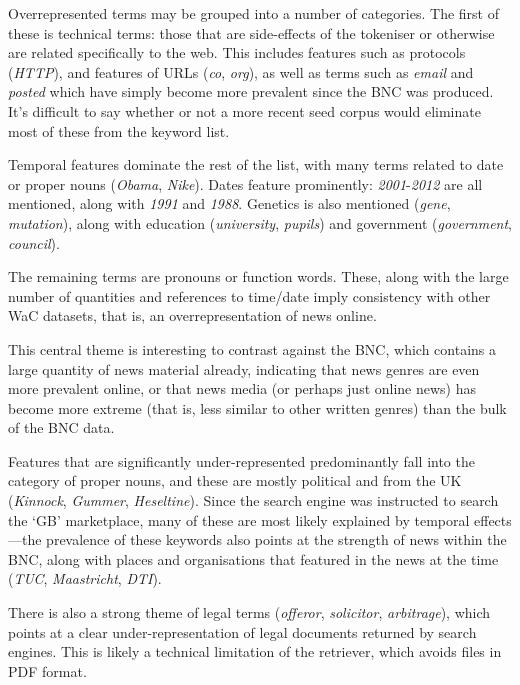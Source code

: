 Overrepresented terms may be grouped into a number of categories.  The first of these is technical terms: those that are side-effects of the tokeniser or otherwise are related specifically to the web.  This includes features such as protocols (\textsl{HTTP}), and features of URLs (\textsl{co}, \textsl{org}), as well as terms such as \textsl{email} and \textsl{posted} which have simply become more prevalent since the BNC was produced.  It's difficult to say whether or not a more recent seed corpus would eliminate most of these from the keyword list.



Temporal features dominate the rest of the list, with many terms related to date or proper nouns (\textsl{Obama}, \textsl{Nike}).  Dates feature prominently: \textsl{2001}-\textsl{2012} are all mentioned, along with \textsl{1991} and \textsl{1988}.  Genetics is also mentioned (\textsl{gene}, \textsl{mutation}), along with education (\textsl{university}, \textsl{pupils}) and government (\textsl{government}, \textsl{council}).

The remaining terms are pronouns or function words.  These, along with the large number of quantities and references to time/date imply consistency with other WaC datasets, that is, an overrepresentation of news online\cite{sridharan2012modeling}.

This central theme is interesting to contrast against the BNC, which contains a large quantity of news material already, indicating that news genres are even more prevalent online, or that news media (or perhaps just online news) has become more extreme (that is, less similar to other written genres) than the bulk of the BNC data.

Features that are significantly under-represented predominantly fall into the category of proper nouns, and these are mostly political and from the UK (\textsl{Kinnock}, \textsl{Gummer}, \textsl{Heseltine}).  Since the search engine was instructed to search the `GB' marketplace, many of these are most likely explained by temporal effects---the prevalence of these keywords also points at the strength of news within the BNC, along with places and organisations that featured in the news at the time (\textsl{TUC}, \textsl{Maastricht}, \textsl{DTI}).

There is also a strong theme of legal terms (\textsl{offeror}, \textsl{solicitor}, \textsl{arbitrage}), which points at a clear under-representation of legal documents returned by search engines.  This is likely a technical limitation of the retriever, which avoids files in PDF format.

